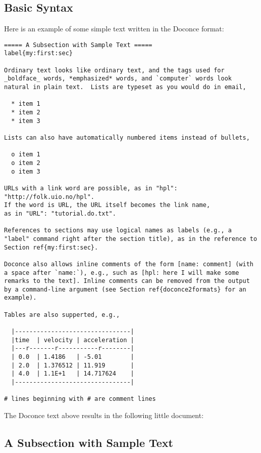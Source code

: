 \documentclass[%
oneside,                 %
final,                   %
10pt]{article}
\begin{document}
\subsection{Basic Syntax}

Here is an example of some simple text written in the Doconce format:
\begin{Verbatim}[fontsize=\fontsize{9pt}{9pt},tabsize=8,baselinestretch=0.85,
fontfamily=tt,xleftmargin=7mm]
===== A Subsection with Sample Text =====
label{my:first:sec}

Ordinary text looks like ordinary text, and the tags used for
_boldface_ words, *emphasized* words, and `computer` words look
natural in plain text.  Lists are typeset as you would do in email,

  * item 1
  * item 2
  * item 3

Lists can also have automatically numbered items instead of bullets,

  o item 1
  o item 2
  o item 3

URLs with a link word are possible, as in "hpl": "http://folk.uio.no/hpl".
If the word is URL, the URL itself becomes the link name,
as in "URL": "tutorial.do.txt".

References to sections may use logical names as labels (e.g., a
"label" command right after the section title), as in the reference to
Section ref{my:first:sec}.

Doconce also allows inline comments of the form [name: comment] (with
a space after `name:`), e.g., such as [hpl: here I will make some
remarks to the text]. Inline comments can be removed from the output
by a command-line argument (see Section ref{doconce2formats} for an
example).

Tables are also supperted, e.g.,

  |--------------------------------|
  |time  | velocity | acceleration |
  |---r-------r-----------r--------|
  | 0.0  | 1.4186   | -5.01        |
  | 2.0  | 1.376512 | 11.919       |
  | 4.0  | 1.1E+1   | 14.717624    |
  |--------------------------------|

# lines beginning with # are comment lines
\end{Verbatim}
\noindent
The Doconce text above results in the following little document:

\subsection{A Subsection with Sample Text}
\label{my:first:sec}
\end{document}
